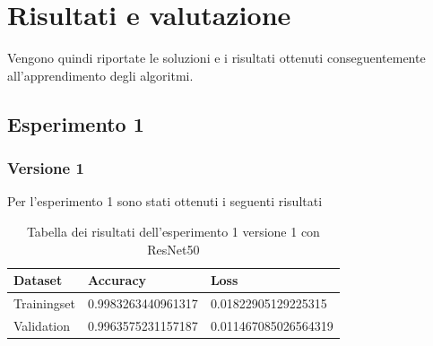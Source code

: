 \section{Risultati e valutazione}

Vengono quindi riportate le soluzioni e i risultati ottenuti conseguentemente all'apprendimento degli algoritmi.

\subsection{Esperimento 1}


\subsubsection{Versione 1}
Per l'esperimento 1 sono stati ottenuti i seguenti risultati 

\begin{table}[H]
    \begin{tabular}{|l|l|l|}
    \hline
    \textbf{Dataset}     & \textbf{Accuracy}           & \textbf{Loss}                 \\ \hline
    Trainingset & 0.9983263440961317 & 0.01822905129225315  \\ \hline
    Validation  & 0.9963575231157187 & 0.011467085026564319 \\ \hline
    \end{tabular}
   	 \caption{\label{tab:esperimento1_v1_risultati}Tabella dei risultati dell'esperimento 1 versione 1 con ResNet50}
\end{table}

